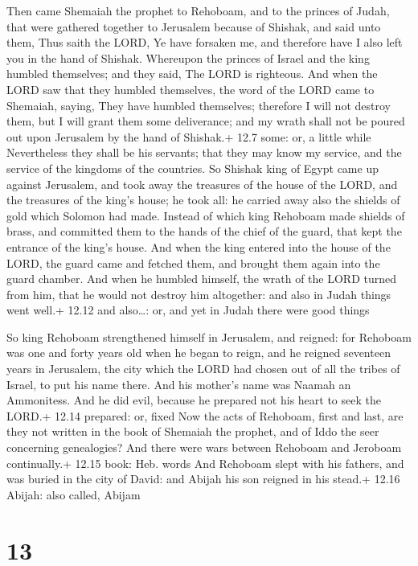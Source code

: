  Then came Shemaiah the prophet to Rehoboam, and to the
princes of Judah, that were gathered together to Jerusalem because of
Shishak, and said unto them, Thus saith the LORD, Ye have forsaken me,
and therefore have I also left you in the hand of Shishak. 
Whereupon the princes of Israel and the king humbled themselves; and
they said, The LORD is righteous.  And when the LORD saw
that they humbled themselves, the word of the LORD came to Shemaiah,
saying, They have humbled themselves; therefore I will not destroy them,
but I will grant them some deliverance; and my wrath shall not be poured
out upon Jerusalem by the hand of Shishak.+ 12.7 some: or, a little
while  Nevertheless they shall be his servants; that they
may know my service, and the service of the kingdoms of the countries.
 So Shishak king of Egypt came up against Jerusalem, and
took away the treasures of the house of the LORD, and the treasures of
the king's house; he took all: he carried away also the shields of gold
which Solomon had made.  Instead of which king Rehoboam
made shields of brass, and committed them to the hands of the chief of
the guard, that kept the entrance of the king's house.  And
when the king entered into the house of the LORD, the guard came and
fetched them, and brought them again into the guard chamber.
 And when he humbled himself, the wrath of the LORD turned
from him, that he would not destroy him altogether: and also in Judah
things went well.+ 12.12 and also\ldots: or, and yet in Judah there were
good things

 So king Rehoboam strengthened himself in Jerusalem, and
reigned: for Rehoboam was one and forty years old when he began to
reign, and he reigned seventeen years in Jerusalem, the city which the
LORD had chosen out of all the tribes of Israel, to put his name there.
And his mother's name was Naamah an Ammonitess.  And he did
evil, because he prepared not his heart to seek the LORD.+ 12.14
prepared: or, fixed  Now the acts of Rehoboam, first and
last, are they not written in the book of Shemaiah the prophet, and of
Iddo the seer concerning genealogies? And there were wars between
Rehoboam and Jeroboam continually.+ 12.15 book: Heb. words 
And Rehoboam slept with his fathers, and was buried in the city of
David: and Abijah his son reigned in his stead.+ 12.16 Abijah: also
called, Abijam

\hypertarget{section-12}{%
\section{13}\label{section-12}}

